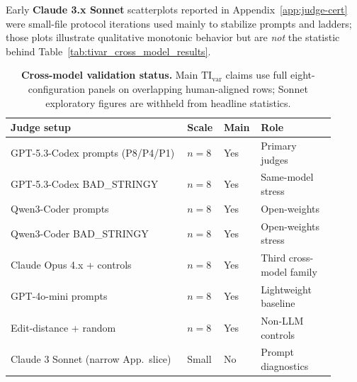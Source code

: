 \documentclass{article}
\begin{document}
Early \textbf{Claude 3.x Sonnet} scatterplots reported in Appendix~\ref{app:judge-cert} were small-file protocol iterations used mainly to stabilize prompts and ladders; those plots illustrate qualitative monotonic behavior but are \emph{not} the statistic behind Table~\ref{tab:tivar_cross_model_results}.

\begin{table}[t]
  \centering
  \scriptsize
  \setlength{\tabcolsep}{3pt}%
  \begin{tabular}{@{}>{\raggedright\arraybackslash}p{0.52\linewidth}
    >{\centering\arraybackslash}p{0.09\linewidth}
    >{\centering\arraybackslash}p{0.08\linewidth}
    >{\raggedright\arraybackslash}p{0.22\linewidth}@{}}
    \toprule
    \textbf{Judge setup}                 &
    \textbf{Scale}                       &
    \textbf{Main}                        &
    \textbf{Role}                                                                     \\
    \midrule
    GPT-5.3-Codex prompts (P8/P4/P1)     & \(n{=}8\) & Yes & Primary judges           \\
    GPT-5.3-Codex BAD\_STRINGY           & \(n{=}8\) & Yes & Same-model stress        \\
    Qwen3-Coder prompts                  & \(n{=}8\) & Yes & Open-weights             \\
    Qwen3-Coder BAD\_STRINGY             & \(n{=}8\) & Yes & Open-weights stress      \\
    Claude Opus 4.x + controls           & \(n{=}8\) & Yes & Third cross-model family \\
    GPT-4o-mini prompts                  & \(n{=}8\) & Yes & Lightweight baseline     \\
    Edit-distance + random               & \(n{=}8\) & Yes & Non-LLM controls         \\
    Claude 3 Sonnet (narrow App.\ slice) & Small     & No  & Prompt diagnostics       \\
    \bottomrule
  \end{tabular}
  \caption{\textbf{Cross-model validation status.}
  Main \(\mathrm{TI}_{\mathrm{var}}\) claims use full eight-configuration panels on overlapping human-aligned rows; Sonnet exploratory figures are withheld from headline statistics.}
  \label{tab:app-cross-model-status}
\end{table}
\end{document}
